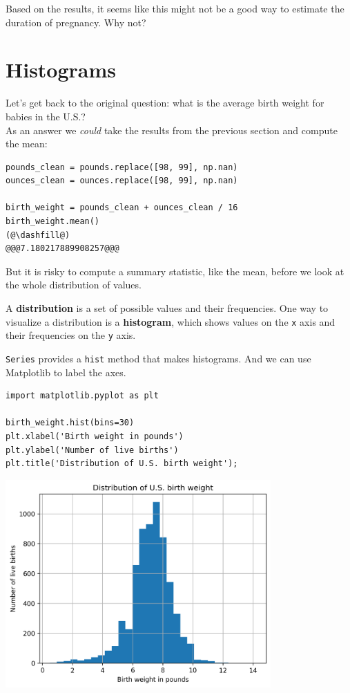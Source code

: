 Based on the results, it seems like this might not be a good way to
estimate the duration of pregnancy. Why not?

\hypertarget{histograms}{%
\section{Histograms}\label{histograms}}

Let's get back to the original question: what is the average birth
weight for babies in the U.S.?\\
As an answer we \emph{could} take the results from the previous section
and compute the mean:

\begin{lstlisting}[]
pounds_clean = pounds.replace([98, 99], np.nan)
ounces_clean = ounces.replace([98, 99], np.nan)

birth_weight = pounds_clean + ounces_clean / 16
birth_weight.mean()
(@\dashfill@)
@@@7.180217889908257@@@
\end{lstlisting}

But it is risky to compute a summary statistic, like the mean, before we
look at the whole distribution of values.

A \textbf{distribution} is a set of possible values and their
frequencies. One way to visualize a distribution is a
\textbf{histogram}, which shows values on the
\passthrough{\lstinline!x!} axis and their frequencies on the
\passthrough{\lstinline!y!} axis.

\passthrough{\lstinline!Series!} provides a
\passthrough{\lstinline!hist!} method that makes histograms. And we can
use Matplotlib to label the axes.

\begin{lstlisting}[]
import matplotlib.pyplot as plt

birth_weight.hist(bins=30)
plt.xlabel('Birth weight in pounds')
plt.ylabel('Number of live births')
plt.title('Distribution of U.S. birth weight');
\end{lstlisting}

\begin{center}
\includegraphics[width=4in]{chapters/07_dataframes_files/07_dataframes_61_0.png}
\end{center}

